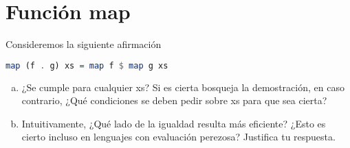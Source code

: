 \documentclass[spanish,12pt,letterpaper]{article}
\begin{document}
\section{Función map}
Consideremos la siguiente afirmación
\begin{lstlisting}[language=Haskell]
  map (f . g) xs = map f $ map g xs
\end{lstlisting}
\begin{enumerate}[(a)]
\item ¿Se cumple para cualquier xs? Si es cierta bosqueja la demostración, en
  caso contrario, ¿Qué condiciones se deben pedir sobre xs para que sea cierta?
\item Intuitivamente, ¿Qué lado de la igualdad resulta más eficiente? ¿Esto es
  cierto incluso en lenguajes con evaluación perezosa? Justifica tu respuesta.
\end{enumerate}
\end{document}
